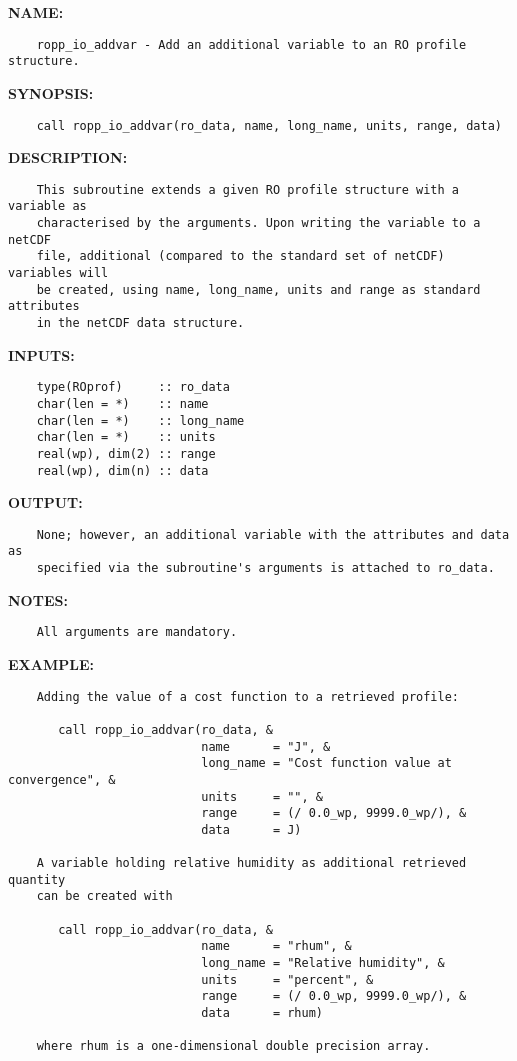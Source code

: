 \label{ch:robo57}
\label{ch:ExtendingDatatypes_ropp_io_addvar}
\textbf{NAME:}\hspace{0.08in}\begin{Verbatim}
    ropp_io_addvar - Add an additional variable to an RO profile structure.
\end{Verbatim}
\textbf{SYNOPSIS:}\hspace{0.08in}\begin{Verbatim}
    call ropp_io_addvar(ro_data, name, long_name, units, range, data)
\end{Verbatim}
\textbf{DESCRIPTION:}\hspace{0.08in}\begin{Verbatim}
    This subroutine extends a given RO profile structure with a variable as
    characterised by the arguments. Upon writing the variable to a netCDF
    file, additional (compared to the standard set of netCDF) variables will
    be created, using name, long_name, units and range as standard attributes
    in the netCDF data structure.
\end{Verbatim}
\textbf{INPUTS:}\hspace{0.08in}\begin{Verbatim}
    type(ROprof)     :: ro_data
    char(len = *)    :: name
    char(len = *)    :: long_name
    char(len = *)    :: units
    real(wp), dim(2) :: range
    real(wp), dim(n) :: data
\end{Verbatim}
\textbf{OUTPUT:}\hspace{0.08in}\begin{Verbatim}
    None; however, an additional variable with the attributes and data as
    specified via the subroutine's arguments is attached to ro_data.
\end{Verbatim}
\textbf{NOTES:}\hspace{0.08in}\begin{Verbatim}
    All arguments are mandatory.
\end{Verbatim}
\textbf{EXAMPLE:}\hspace{0.08in}\begin{Verbatim}
    Adding the value of a cost function to a retrieved profile:

       call ropp_io_addvar(ro_data, &
                           name      = "J", &
                           long_name = "Cost function value at convergence", &
                           units     = "", &
                           range     = (/ 0.0_wp, 9999.0_wp/), &
                           data      = J)

    A variable holding relative humidity as additional retrieved quantity
    can be created with

       call ropp_io_addvar(ro_data, &
                           name      = "rhum", &
                           long_name = "Relative humidity", &
                           units     = "percent", &
                           range     = (/ 0.0_wp, 9999.0_wp/), &
                           data      = rhum)

    where rhum is a one-dimensional double precision array.
\end{Verbatim}
